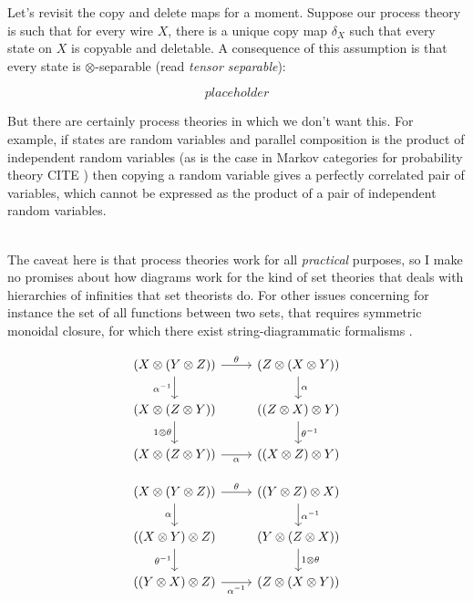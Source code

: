 Let's revisit the copy and delete maps for a moment. Suppose our process theory is such that for every wire $X$, there is a unique copy map $\delta_X$ such that every state on $X$ is copyable and deletable. A consequence of this assumption is that every state is $\otimes$-separable (read \emph{tensor separable}):

\[placeholder\]

But there are certainly process theories in which we don't want this. For example, if states are random variables and parallel composition is the product of independent random variables (as is the case in Markov categories for probability theory \bR CITE \e) then copying a random variable gives a perfectly correlated pair of variables, which cannot be expressed as the product of a pair of independent random variables.



\\

The caveat here is that process theories work for all \emph{practical} purposes, so I make no promises about how diagrams work for the kind of set theories that deals with hierarchies of infinities that set theorists do. For other issues concerning for instance the set of all functions between two sets, that requires symmetric monoidal closure, for which there exist string-diagrammatic formalisms \citep{}.



\begin{marginfigure}
\[\begin{tikzcd}[ampersand replacement=\&]
    {(X \otimes (Y \otimes Z))} \& {(Z \otimes (X \otimes Y))} \\
    {(X \otimes (Z \otimes Y))} \& {((Z \otimes X) \otimes Y)} \\
    {(X \otimes (Z \otimes Y))} \& {((X \otimes Z) \otimes Y)}
    \arrow["\theta", from=1-1, to=1-2]
    \arrow["\alpha", from=1-2, to=2-2]
    \arrow["{\theta^{-1}}", from=2-2, to=3-2]
    \arrow["{\alpha^{-1}}"', from=1-1, to=2-1]
    \arrow["{1 \otimes \theta}"', from=2-1, to=3-1]
    \arrow["\alpha"', from=3-1, to=3-2]
\end{tikzcd}\]
\end{marginfigure}

\begin{marginfigure}
\[\begin{tikzcd}[ampersand replacement=\&]
    {(X \otimes (Y \otimes Z))} \& {((Y \otimes Z) \otimes X)} \\
    {((X \otimes Y) \otimes Z)} \& {(Y \otimes (Z \otimes X))} \\
    {((Y \otimes X) \otimes Z)} \& {(Z \otimes (X \otimes Y))}
    \arrow["\theta", from=1-1, to=1-2]
    \arrow["{\alpha^{-1}}", from=1-2, to=2-2]
    \arrow["{1\otimes \theta}", from=2-2, to=3-2]
    \arrow["{\alpha^{-1}}"', from=3-1, to=3-2]
    \arrow["{\theta^{-1}}"', from=2-1, to=3-1]
    \arrow["\alpha"', from=1-1, to=2-1]
\end{tikzcd}\]
\end{marginfigure}

